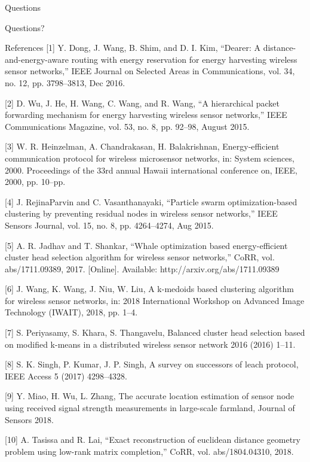 \documentclass{beamer}
\begin{document}
\begin{frame}[t]{Questions} \vspace{30pt}
\Huge
\begin{center}
Questions?
\end{center}
\end{frame}

\begin{frame}[t]{References}
\tiny
[1] Y. Dong, J. Wang, B. Shim, and D. I. Kim, “Dearer: A distance-and-energy-aware routing with energy reservation for energy harvesting wireless sensor networks,” IEEE Journal on Selected Areas in Communications, vol. 34, no. 12, pp. 3798–3813, Dec 2016.

[2] D. Wu, J. He, H. Wang, C. Wang, and R. Wang, “A hierarchical packet forwarding mechanism for energy harvesting wireless sensor networks,” IEEE Communications Magazine, vol. 53, no. 8, pp. 92–98, August 2015.

[3] W. R. Heinzelman, A. Chandrakasan, H. Balakrishnan, Energy-efficient communication protocol for wireless microsensor networks, in: System sciences, 2000. Proceedings of the 33rd annual Hawaii international conference on, IEEE, 2000, pp. 10–pp.

[4] J. RejinaParvin and C. Vasanthanayaki, “Particle swarm optimization-based clustering by preventing residual nodes in wireless sensor networks,” IEEE Sensors Journal, vol. 15, no. 8, pp. 4264–4274, Aug 2015.

[5] A. R. Jadhav and T. Shankar, “Whale optimization based energy-efficient cluster head selection algorithm for wireless sensor networks,” CoRR, vol. abs/1711.09389, 2017. [Online]. Available: http://arxiv.org/abs/1711.09389

[6] J. Wang, K. Wang, J. Niu, W. Liu, A k-medoids based clustering algorithm for wireless sensor networks, in: 2018 International Workshop on Advanced Image Technology (IWAIT), 2018, pp. 1–4.

[7] S. Periyasamy, S. Khara, S. Thangavelu, Balanced cluster head selection based on modified k-means in a distributed wireless sensor network 2016 (2016) 1–11.

[8] S. K. Singh, P. Kumar, J. P. Singh, A survey on successors of leach protocol, IEEE Access 5 (2017) 4298–4328.

[9] Y. Miao, H. Wu, L. Zhang, The accurate location estimation of sensor node using received signal strength measurements in large-scale farmland, Journal of Sensors 2018.

[10] A. Tasissa and R. Lai, “Exact reconstruction of euclidean distance geometry problem using low-rank matrix completion,” CoRR, vol. abs/1804.04310, 2018.

\end{frame}
\end{document}
